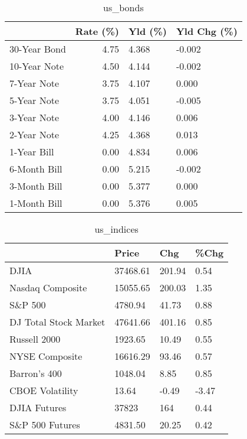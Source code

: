 \documentclass{article}%
\begin{document}
%


\begin{table}[htbp]%
\caption{us\_bonds}%
\centering%
\begin{adjustbox}{width=1\textwidth}%
\begin{tabular}{lrll}
\toprule
             &  Rate (\%) & Yld (\%) & Yld Chg (\%) \\
\midrule
30-Year Bond &      4.75 &   4.368 &      -0.002 \\
10-Year Note &      4.50 &   4.144 &      -0.002 \\
 7-Year Note &      3.75 &   4.107 &       0.000 \\
 5-Year Note &      3.75 &   4.051 &      -0.005 \\
 3-Year Note &      4.00 &   4.146 &       0.006 \\
 2-Year Note &      4.25 &   4.368 &       0.013 \\
 1-Year Bill &      0.00 &   4.834 &       0.006 \\
6-Month Bill &      0.00 &   5.215 &      -0.002 \\
3-Month Bill &      0.00 &   5.377 &       0.000 \\
1-Month Bill &      0.00 &   5.376 &       0.005 \\
\bottomrule
\end{tabular}
%
\end{adjustbox}%
\end{table}

%


\begin{table}[htbp]%
\caption{us\_indices}%
\centering%
\begin{adjustbox}{width=1\textwidth}%
\begin{tabular}{llll}
\toprule
                      &    Price &    Chg &  \%Chg \\
\midrule
                 DJIA & 37468.61 & 201.94 &  0.54 \\
     Nasdaq Composite & 15055.65 & 200.03 &  1.35 \\
              S\&P 500 &  4780.94 &  41.73 &  0.88 \\
DJ Total Stock Market & 47641.66 & 401.16 &  0.85 \\
         Russell 2000 &  1923.65 &  10.49 &  0.55 \\
       NYSE Composite & 16616.29 &  93.46 &  0.57 \\
         Barron's 400 &  1048.04 &   8.85 &  0.85 \\
      CBOE Volatility &    13.64 &  -0.49 & -3.47 \\
         DJIA Futures &    37823 &    164 &  0.44 \\
      S\&P 500 Futures &  4831.50 &  20.25 &  0.42 \\
\bottomrule
\end{tabular}
%
\end{adjustbox}%
\end{table}
\end{document}
